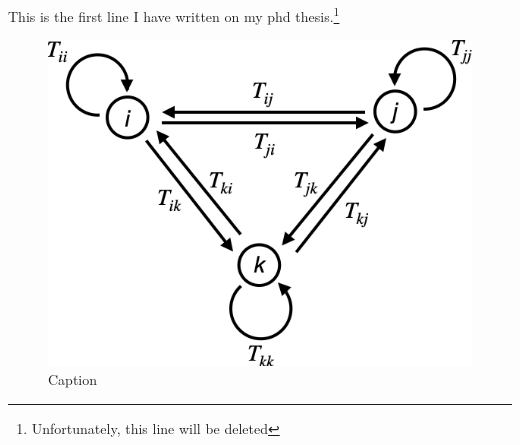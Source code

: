 This is the first line I have written on my phd thesis.\footnote{Unfortunately, this line will be deleted}
\vfill

\newpage
\begin{figure}
    \centering
    \includegraphics[scale=0.5]{figures/graph.png}
    \caption{Caption}
    \label{fig:my_label}
\end{figure}